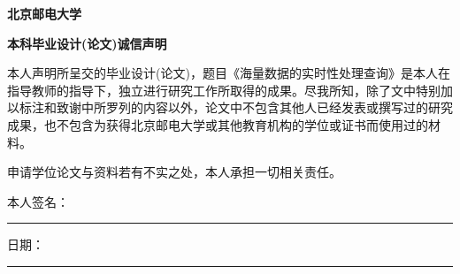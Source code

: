 \begin{center}
\textbf{\songti{}北京邮电大学}
\end{center}

\begin{center}
\textbf{\songti{} 本科毕业设计(论文)诚信声明}
\end{center}
\songti{}

本人声明所呈交的毕业设计(论文)，题目《海量数据的实时性处理查询》是本人在指导教师的指导下，独立进行研究工作所取得的成果。尽我所知，除了文中特别加以标注和致谢中所罗列的内容以外，论文中不包含其他人已经发表或撰写过的研究成果，也不包含为获得北京邮电大学或其他教育机构的学位或证书而使用过的材料。

申请学位论文与资料若有不实之处，本人承担一切相关责任。 \newline

\indent 本人签名：\rule[-2pt]{4cm}{0.5pt}\quad 日期：\rule[-2pt]{4cm}{0.5pt} 